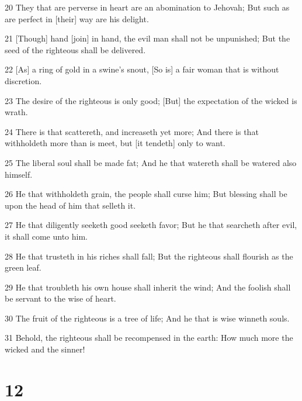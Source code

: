 \par 20 They that are perverse in heart are an abomination to Jehovah; But such as are perfect in [their] way are his delight.
\par 21 [Though] hand [join] in hand, the evil man shall not be unpunished; But the seed of the righteous shall be delivered.
\par 22 [As] a ring of gold in a swine's snout, [So is] a fair woman that is without discretion.
\par 23 The desire of the righteous is only good; [But] the expectation of the wicked is wrath.
\par 24 There is that scattereth, and increaseth yet more; And there is that withholdeth more than is meet, but [it tendeth] only to want.
\par 25 The liberal soul shall be made fat; And he that watereth shall be watered also himself.
\par 26 He that withholdeth grain, the people shall curse him; But blessing shall be upon the head of him that selleth it.
\par 27 He that diligently seeketh good seeketh favor; But he that searcheth after evil, it shall come unto him.
\par 28 He that trusteth in his riches shall fall; But the righteous shall flourish as the green leaf.
\par 29 He that troubleth his own house shall inherit the wind; And the foolish shall be servant to the wise of heart.
\par 30 The fruit of the righteous is a tree of life; And he that is wise winneth souls.
\par 31 Behold, the righteous shall be recompensed in the earth: How much more the wicked and the sinner!

\chapter{12}

